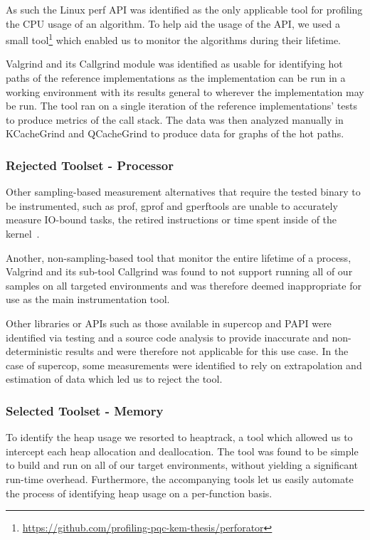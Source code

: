As such the Linux perf API was identified as the only applicable tool for profiling the CPU usage of an algorithm. To help aid the usage of the API, we used a small tool\footnote{\href{https://github.com/profiling-pqc-kem-thesis/perforator}{https://github.com/profiling-pqc-kem-thesis/perforator}} which enabled us to monitor the algorithms during their lifetime.

Valgrind and its Callgrind module was identified as usable for identifying hot paths of the reference implementations as the implementation can be run in a working environment with its results general to wherever the implementation may be run. The tool ran on a single iteration of the reference implementations' tests to produce metrics of the call stack. The data was then analyzed manually in KCacheGrind and QCacheGrind to produce data for graphs of the hot paths.

\subsubsection{Rejected Toolset - Processor}
\label{section:method:experiment:phase1:rejected-toolset-processor}
Other sampling-based measurement alternatives that require the tested binary to be instrumented, such as prof, gprof and gperftools are unable to accurately measure IO-bound tasks, the retired instructions or time spent inside of the kernel~\cite{gprof}.

Another, non-sampling-based tool that monitor the entire lifetime of a process, Valgrind and its sub-tool Callgrind was found to not support running all of our samples on all targeted environments and was therefore deemed inappropriate for use as the main instrumentation tool.

Other libraries or APIs such as those available in \gls{supercop} and PAPI were identified via testing and a source code analysis to provide inaccurate and non-deterministic results and were therefore not applicable for this use case. In the case of \gls{supercop}, some measurements were identified to rely on extrapolation and estimation of data which led us to reject the tool.

\subsubsection{Selected Toolset - Memory}
\label{section:method:experiment:phase1:selected-toolset-memory}

To identify the heap usage we resorted to heaptrack, a tool which allowed us to intercept each heap allocation and deallocation. The tool was found to be simple to build and run on all of our target environments, without yielding a significant run-time overhead. Furthermore, the accompanying tools let us easily automate the process of identifying heap usage on a per-function basis.

